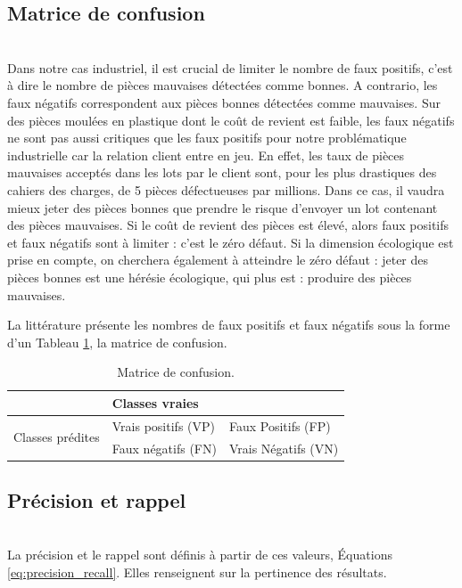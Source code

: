 \subsection{Matrice de confusion}\mbox{} \\
Dans notre cas industriel, il est crucial de limiter le nombre de faux positifs, c'est à dire le nombre de pièces mauvaises détectées comme bonnes.
A contrario, les faux négatifs correspondent aux pièces bonnes détectées comme mauvaises.
Sur des pièces moulées en plastique dont le coût de revient est faible, les faux négatifs ne sont pas aussi critiques que les faux positifs pour notre problématique industrielle car la relation client entre en jeu.
En effet, les taux de pièces mauvaises acceptés dans les lots par le client sont, pour les plus drastiques des cahiers des charges, de 5 pièces défectueuses par millions.
Dans ce cas, il vaudra mieux jeter des pièces bonnes que prendre le risque d'envoyer un lot contenant des pièces mauvaises.
Si le coût de revient des pièces est élevé, alors faux positifs et faux négatifs sont à limiter : c'est le zéro défaut.
Si la dimension écologique est prise en compte, on cherchera également à atteindre le zéro défaut : jeter des pièces bonnes est une hérésie écologique, qui plus est : produire des pièces mauvaises.

La littérature présente les nombres de faux positifs et faux négatifs sous la forme d'un Tableau \ref{tab:confusion_matrix}, la matrice de confusion.

\begin{table}[]
	\centering
	\begin{tabular}{l|l|l|}
		\cline{2-3}
		& \multicolumn{2}{l|}{Classes vraies}               \\ \hline
		\multicolumn{1}{|l|}{\multirow{2}{*}{Classes prédites}} & Vrais positifs (VP) & Faux Positifs (FP)  \\ \cline{2-3} 
		\multicolumn{1}{|l|}{}                            & Faux négatifs (FN)  & Vrais Négatifs (VN) \\ \hline
	\end{tabular}
	\caption{Matrice de confusion.}
	\label{tab:confusion_matrix}
\end{table}

\subsection{Précision et rappel}\mbox{} \\
La précision et le rappel sont définis à partir de ces valeurs, Équations \ref{eq:precision_recall}.
Elles renseignent sur la pertinence des résultats.

